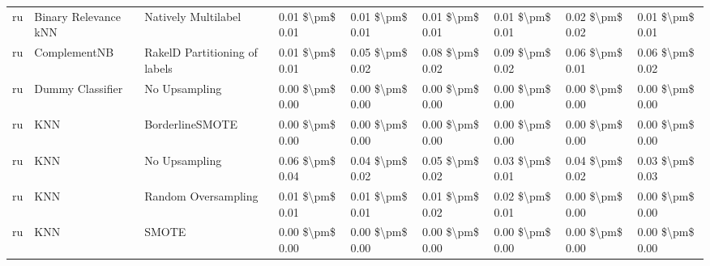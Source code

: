 \begin{tabular}{lllllllll}
      ru &            Binary Relevance kNN &           Natively Multilabel & 0.01 \$\textbackslash pm\$ 0.01 &           0.01 \$\textbackslash pm\$ 0.01 &       0.01 \$\textbackslash pm\$ 0.01 &        0.01 \$\textbackslash pm\$ 0.01 &                         0.02 \$\textbackslash pm\$ 0.02 &     0.01 \$\textbackslash pm\$ 0.01 \\
      ru &                    ComplementNB & RakelD Partitioning of labels & 0.01 \$\textbackslash pm\$ 0.01 &           0.05 \$\textbackslash pm\$ 0.02 &       0.08 \$\textbackslash pm\$ 0.02 &        0.09 \$\textbackslash pm\$ 0.02 &                         0.06 \$\textbackslash pm\$ 0.01 &     0.06 \$\textbackslash pm\$ 0.02 \\
      ru &                Dummy Classifier &                 No Upsampling & 0.00 \$\textbackslash pm\$ 0.00 &           0.00 \$\textbackslash pm\$ 0.00 &       0.00 \$\textbackslash pm\$ 0.00 &        0.00 \$\textbackslash pm\$ 0.00 &                         0.00 \$\textbackslash pm\$ 0.00 &     0.00 \$\textbackslash pm\$ 0.00 \\
      ru &                             KNN &               BorderlineSMOTE & 0.00 \$\textbackslash pm\$ 0.00 &           0.00 \$\textbackslash pm\$ 0.00 &       0.00 \$\textbackslash pm\$ 0.00 &        0.00 \$\textbackslash pm\$ 0.00 &                         0.00 \$\textbackslash pm\$ 0.00 &     0.00 \$\textbackslash pm\$ 0.00 \\
      ru &                             KNN &                 No Upsampling & 0.06 \$\textbackslash pm\$ 0.04 &           0.04 \$\textbackslash pm\$ 0.02 &       0.05 \$\textbackslash pm\$ 0.02 &        0.03 \$\textbackslash pm\$ 0.01 &                         0.04 \$\textbackslash pm\$ 0.02 &     0.03 \$\textbackslash pm\$ 0.03 \\
      ru &                             KNN &           Random Oversampling & 0.01 \$\textbackslash pm\$ 0.01 &           0.01 \$\textbackslash pm\$ 0.01 &       0.01 \$\textbackslash pm\$ 0.02 &        0.02 \$\textbackslash pm\$ 0.01 &                         0.00 \$\textbackslash pm\$ 0.00 &     0.00 \$\textbackslash pm\$ 0.00 \\
      ru &                             KNN &                         SMOTE & 0.00 \$\textbackslash pm\$ 0.00 &           0.00 \$\textbackslash pm\$ 0.00 &       0.00 \$\textbackslash pm\$ 0.00 &        0.00 \$\textbackslash pm\$ 0.00 &                         0.00 \$\textbackslash pm\$ 0.00 &     0.00 \$\textbackslash pm\$ 0.00 \\

\end{tabular}
